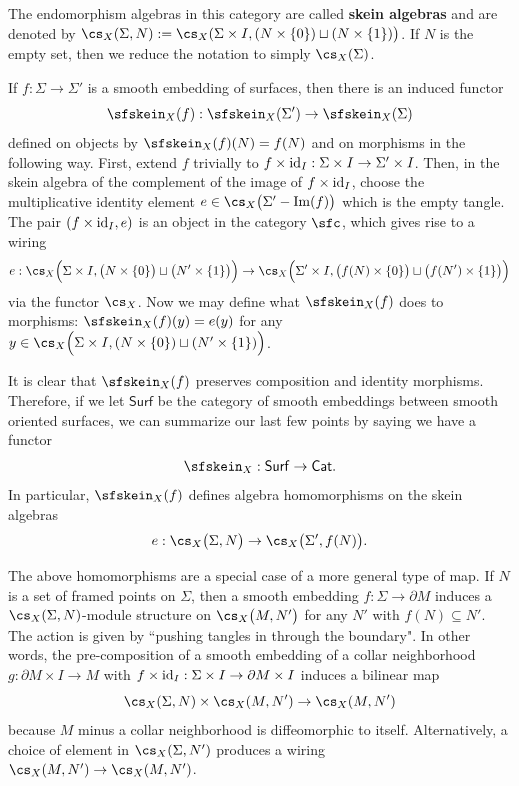 
The endomorphism algebras in this category are called \textbf{skein algebras} and are denoted by $\cs_X(\Sigma, N) := \cs_X(\Sigma \times I, (N \times \{0\}) \sqcup (N \times \{1\}) \big)$. If $N$ is the empty set, then we reduce the notation to simply $\cs_X(\Sigma)$.

If $f: \Sigma \to \Sigma'$ is a smooth embedding of surfaces, then there is an induced functor 
\[
\sfskein_X(f): \sfskein_X(\Sigma') \to \sfskein_X(\Sigma)
\]
defined on objects by $\sfskein_X(f)(N) = f(N)$ and on morphisms in the following way. First, extend $f$ trivially to $f \times {\rm{id}}_I: \Sigma \times I \to \Sigma' \times I$. Then, in the skein algebra of the complement of the image of $f \times {\rm{id}}_I$, choose the multiplicative identity element $e \in \cs_X\big( \Sigma' - \im(f) \big)$ which is the empty tangle. The pair $(f \times {\rm{id}}_I, e)$ is an object in the category $\sfc$, which gives rise to a wiring
\[e: \cs_X\Big(\Sigma \times I, \big(N \times \{0\}\big) \sqcup \big(N' \times \{1\}\big) \Big) \to \cs_X\Big(\Sigma' \times I, \big(f(N) \times \{0\}\big) \sqcup \big( f(N') \times \{1\} \big) \Big)\]
via the functor $\cs_X$. Now we may define what $\sfskein_X(f)$ does to morphisms: $\sfskein_X(f)(y) = e(y)$ for any $y \in \cs_X\Big(\Sigma \times I, (N \times \{0\}) \sqcup (N' \times \{1\}) \Big)$.


It is clear that $\sfskein_X(f)$ preserves composition and identity morphisms. Therefore, if we let $\mathsf{Surf}$ be the category of smooth embeddings between smooth oriented surfaces, we can summarize our last few points by saying we have a functor
\[
\sfskein_X: \mathsf{Surf} \to \mathsf{Cat}.
\]
In particular, $\sfskein_X(f)$ defines algebra homomorphisms on the skein algebras
\[e: \cs_X\big(\Sigma, N\big) \to \cs_X\big(\Sigma', f(N)\big).\]

\begin{remark} \label{rem:skeinaction}
The above homomorphisms are a special case of a more general type of map. If $N$ is a set of framed points on $\Sigma$, then a smooth embedding $f: \Sigma \to \partial M$ induces a $\cs_X(\Sigma, N)$-module structure on $\cs_X\big(M, N'\big)$ for any $N'$ with $f(N) \subseteq N'$. The action is given by ``pushing tangles in through the boundary". In other words, the pre-composition of a smooth embedding of a collar neighborhood $g: \partial M \times I \to M$ with $f \times {\rm{id}}_I: \Sigma\times I \to \partial M \times I$ induces a bilinear map
\[
\cs_X(\Sigma, N) \times \cs_X(M, N') \to \cs_X(M, N')
\]
because $M$ minus a collar neighborhood is diffeomorphic to itself. Alternatively, a choice of element in $\cs_X(\Sigma, N')$ produces a wiring $\cs_X(M, N') \to \cs_X(M, N')$.

\end{remark}


